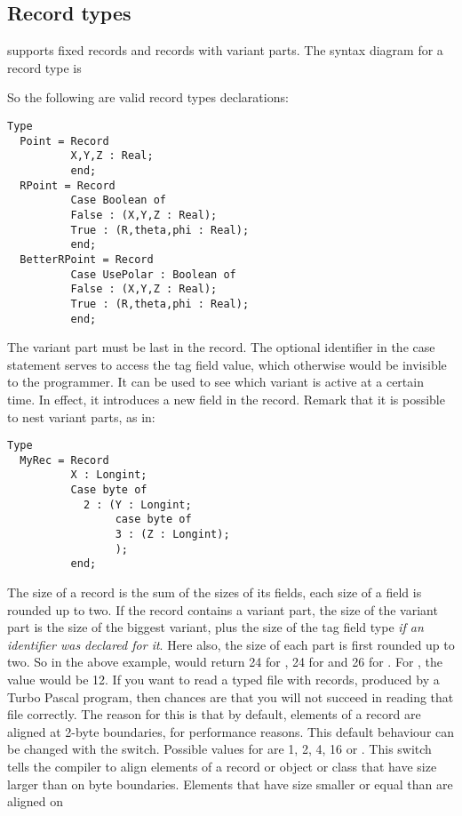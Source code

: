 \documentclass{report}
\begin{document}
\subsection{Record types}
\fpc supports fixed records and records with variant parts.
The syntax diagram for a record type is

So the following are valid record types declarations:
\begin{verbatim}
Type
  Point = Record
          X,Y,Z : Real;
          end;
  RPoint = Record
          Case Boolean of
          False : (X,Y,Z : Real);
          True : (R,theta,phi : Real);
          end;
  BetterRPoint = Record
          Case UsePolar : Boolean of
          False : (X,Y,Z : Real);
          True : (R,theta,phi : Real);
          end;
\end{verbatim}
The variant part must be last in the record. The optional identifier in the
case statement serves to access the tag field value, which otherwise would
be invisible to the programmer. It can be used to see which variant is
active at a certain time. In effect, it introduces a new field in the
record.
Remark that it is possible to  nest variant parts, as in:
\begin{verbatim}
Type
  MyRec = Record
          X : Longint;
          Case byte of
            2 : (Y : Longint;
                 case byte of
                 3 : (Z : Longint);
                 );
          end;
\end{verbatim}
The size of a record is the sum of the sizes of its fields, each size of a
field is rounded up to two. If the record contains a variant part, the size
of the variant part is the size of the biggest variant, plus the size of the
tag field type {\em if an identifier was declared for it}. Here also, the size of
each part is first rounded up to two. So in the above example,
 would return 24 for , 24 for  and
26 for . For , the value would be 12.
If you want to read a typed file with records, produced by
a Turbo Pascal program, then chances are that you will not succeed in
reading that file correctly.
The reason for this is that by default, elements of a record are aligned at
2-byte boundaries, for performance reasons. This default behaviour can be
changed with the  switch. Possible values for
 are 1, 2, 4, 16 or .
This switch tells the compiler to align elements of a record or object or
class that have size larger than  on  byte boundaries.
Elements that have size smaller or equal than  are aligned on
\end{document}

